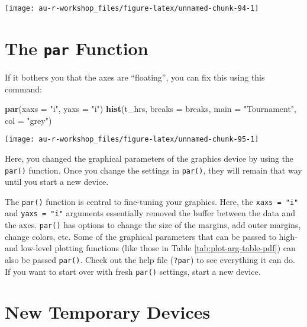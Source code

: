 \documentclass[]{book}
\newenvironment{Shaded}{\begin{snugshade}}{\end{snugshade}}
\newcommand{\KeywordTok}[1]{\textcolor[rgb]{0.13,0.29,0.53}{\textbf{#1}}}
\newcommand{\DataTypeTok}[1]{\textcolor[rgb]{0.13,0.29,0.53}{#1}}
\newcommand{\StringTok}[1]{\textcolor[rgb]{0.31,0.60,0.02}{#1}}
\newcommand{\NormalTok}[1]{#1}
\theoremstyle{definition}
\theoremstyle{definition}
\theoremstyle{definition}
\theoremstyle{remark}
\begin{document}
\begin{center}\texttt{[image: au-r-workshop\_files/figure-latex/unnamed-chunk-94-1]} \end{center}

\section{\texorpdfstring{The \texttt{par}
Function}{The par Function}}\label{the-par-function}

If it bothers you that the axes are ``floating'', you can fix this using
this command:

\begin{Shaded}
\begin{Highlighting}[]
\KeywordTok{par}\NormalTok{(}\DataTypeTok{xaxs =} \StringTok{"i"}\NormalTok{, }\DataTypeTok{yaxs =} \StringTok{"i"}\NormalTok{)}
\KeywordTok{hist}\NormalTok{(t_hrs, }\DataTypeTok{breaks =}\NormalTok{ breaks, }\DataTypeTok{main =} \StringTok{"Tournament"}\NormalTok{, }\DataTypeTok{col =} \StringTok{"grey"}\NormalTok{)}
\end{Highlighting}
\end{Shaded}

\begin{center}\texttt{[image: au-r-workshop\_files/figure-latex/unnamed-chunk-95-1]} \end{center}

Here, you changed the graphical parameters of the graphics device by
using the \texttt{par()} function. Once you change the settings in
\texttt{par()}, they will remain that way until you start a new device.

The \texttt{par()} function is central to fine-tuning your graphics.
Here, the \texttt{xaxs\ =\ "i"} and \texttt{yaxs\ =\ "i"} arguments
essentially removed the buffer between the data and the axes.
\texttt{par()} has options to change the size of the margins, add outer
margins, change colors, etc. Some of the graphical parameters that can
be passed to high- and low-level plotting functions (like those in Table
\ref{tab:plot-arg-table-pdf}) can also be passed \texttt{par()}. Check
out the help file (\texttt{?par}) to see everything it can do. If you
want to start over with fresh \texttt{par()} settings, start a new
device.

\section{New Temporary Devices}\label{new-temporary-devices}
\end{document}
